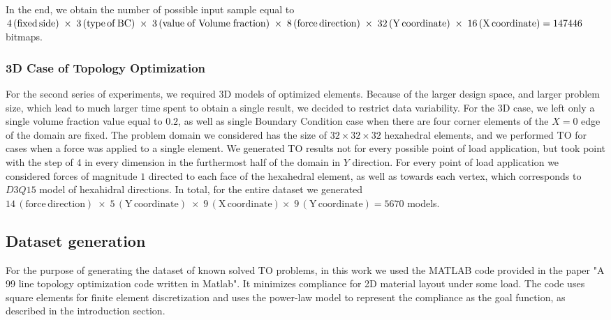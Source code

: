 In the end, we obtain the number of possible input sample equal to $4\,\mathrm{(fixed \, side)} \; \times \; 3\,\mathrm{(type \, of \, BC)} \\ \; \times \; 3\,\mathrm{(value \; of \; Volume \; fraction)} \; \times \; 8\,\mathrm{(force \, direction)} \; \times \; 32\,\mathrm{(Y \, coordinate)} \; \times \; 16\,\mathrm{(X \, coordinate)} = 147446$ bitmaps.

\subsubsection{3D Case of Topology Optimization}

For the second series of experiments, we required 3D models of optimized elements.
Because of the larger design space, and larger problem size, which lead to much larger time spent to obtain a single result, we decided to restrict data variability.
For the 3D case, we left only a single volume fraction value equal to $0.2$, as well as single Boundary Condition case when there are four corner elements of the $ X=0 $ edge of the domain are fixed.
The problem domain we considered has the size of $32 \times 32 \times 32$ hexahedral elements, and we performed TO for cases when a force was applied to a single element. 
We generated TO results not for every possible point of load application, but took point with the step of 4 in every dimension in the furthermost half of the domain in $Y$ direction. 
For every point of load application we considered forces of magnitude $1$ directed to each face of the hexahedral element, as well as towards each vertex, which corresponds to $D3Q15$ model of hexahidral directions. 
In total, for the entire dataset we generated $ 14\,\mathrm{(force \, direction)} \; \times \; 5\,\mathrm{(Y \, coordinate)} \; \times \; 9\,\mathrm{(X \, coordinate)} \times \; 9\,\mathrm{(Y \, coordinate)} = 5670 $ models.


\subsection{Dataset generation}

For the purpose of generating the dataset of known solved TO problems, in this work we used the MATLAB code provided in the paper "A 99 line topology optimization code written in Matlab"\cite{to_99line}.
It minimizes compliance for 2D material layout under some load.
The code uses square elements for finite element discretization and uses the power-law model to represent the compliance as the goal function, as described in the introduction section.
\medskip

